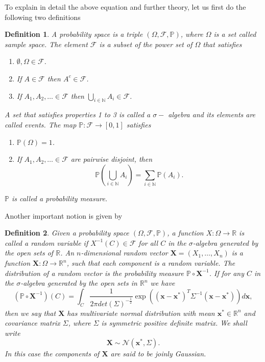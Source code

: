 \documentclass[12pt]{book}
\newtheorem{definition}{Definition}
\newcommand{\p}{\mathbb{P}}
\begin{document}
To explain in detail the above equation and further theory, let us first do the following two definitions
\cite{dudley2002real}
\begin{definition}\label{dfnprobabilitytriple}
A probability space is a triple $(\Omega,\mathscr{F},\p)$, where $\Omega$ is a set called 
sample space.
The element $\mathscr{F}$ is a subset of the power set of $\Omega$ that satisfies
\begin{enumerate}
\item $\emptyset,\Omega\in\mathscr{F}$.
\item If $A\in\mathscr{F}$ then $A^{c}\in\mathscr{F}$.
\item If $A_{1},A_{2},\ldots \in\mathscr{F}$ then $\bigcup_{i\in\mathbb{N}}A_{i}\in\mathscr{F}$.
\end{enumerate}
A set that satisfies properties 1 to 3 is called a $\sigma-$ algebra and its elements are called
events. The map $\p:\mathscr{F}\rightarrow [0,1]$ satisfies
\begin{enumerate}
\item $\p(\Omega)=1$.
\item If $A_{1},A_{2},\ldots \in\mathscr{F}$ are pairwise disjoint, then 
\begin{equation*}
\p(\bigcup_{i\in\mathbb{N}}A_{i})=\sum_{i\in\mathbb{N}}\p(A_{i}).
\end{equation*}
\end{enumerate}
$\p$ is called a probability measure. 
\end{definition}
Another important notion is given by
\begin{definition}\label{dfnrandonvariables}
Given a probability space $(\Omega,\mathscr{F},\p)$, a function $X:\Omega\rightarrow\mathbb{R}$ is called 
a random variable
if $X^{-1}(C)\in\mathscr{F}$ for all $C$ in the $\sigma$-algebra generated by the open sets of $\mathbb{R}$.
 An $n$-dimensional random vector $\textbf{X}=(X_{1},\ldots,X_{n})$ is a function 
$\textbf{X}:\Omega\rightarrow\mathbb{R}^{n}$, such that each component is a random variable. The 
distribution of a random vector is the probability measure $\p\circ \textbf{X}^{-1}$. If for any 
$C$ in the $\sigma$-algebra generated by the open sets in $\mathbb{R}^{n}$ we have
\begin{equation}\label{eqnmultivariateGaussianDefinition}
(\p\circ\textbf{X}^{-1})(C)=\int_{C}
\frac{1}{2\pi det(\Sigma)^{-\frac{1}{2}}}\exp((\textbf{x}-\textbf{x}^{*})^{T}\Sigma^{-1}
(\textbf{x}-\textbf{x}^{*}))d\textbf{x},
\end{equation}
then we say
that $\textbf{X}$ has multivariate normal distribution with mean $\textbf{x}^{*}\in\mathbb{R}^{n}$
and covariance matrix $\Sigma$, where $\Sigma$ is symmetric positive definite matrix. We shall write
\begin{equation}\label{eqnMultivariate}
\textbf{X}\sim \mathcal{N}(\textbf{x}^{*},\Sigma).
\end{equation}
In this case the components of $\textbf{X}$ are said to be \textit{joinly Gaussian}.
\end{definition}
\end{document}
